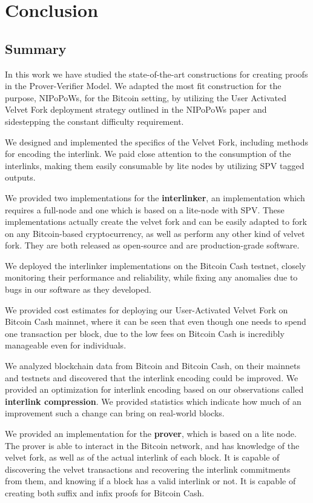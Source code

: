 \chapter{Conclusion}
\label{chap:conclusion}
\section{Summary}
In this work we have studied the state-of-the-art constructions for creating proofs in the Prover-Verifier Model. We adapted the most fit construction for the purpose, NIPoPoWs, for the Bitcoin setting, by utilizing the User Activated Velvet Fork deployment strategy outlined in the NIPoPoWs paper and sidestepping the constant difficulty requirement.


We designed and implemented the specifics of the Velvet Fork, including methods for encoding the interlink. We paid close attention to the consumption of the interlinks, making them easily consumable by lite nodes by utilizing SPV tagged outputs.

We provided two implementations for the \textbf{interlinker}, an implementation which requires a full-node and one which is based on a lite-node with SPV. These implementations actually create the velvet fork and can be easily adapted to fork on any Bitcoin-based cryptocurrency, as well as perform any other kind of velvet fork. They are both released as open-source and are production-grade software.

We deployed the interlinker implementations on the Bitcoin Cash testnet, closely monitoring their performance and reliability, while fixing any anomalies due to bugs in our software as they developed. 

We provided cost estimates for deploying our User-Activated Velvet Fork on Bitcoin Cash mainnet, where it can be seen that even though one needs to spend one transaction per block, due to the low fees on Bitcoin Cash is incredibly manageable even for individuals.

We analyzed blockchain data from Bitcoin and Bitcoin Cash, on their mainnets and testnets and discovered that the interlink encoding could be improved. We provided an optimization for interlink encoding based on our observations called \textbf{interlink compression}. We provided statistics which indicate how much of an improvement such a change can bring on real-world blocks.

We provided an implementation for the \textbf{prover}, which is based on a lite node. The prover is able to interact in the Bitcoin network, and has knowledge of the velvet fork, as well as of the actual interlink of each block. It is capable of discovering the velvet transactions and recovering the interlink commitments from them, and knowing if a block has a valid interlink or not. It is capable of creating both suffix and infix proofs for Bitcoin Cash.

